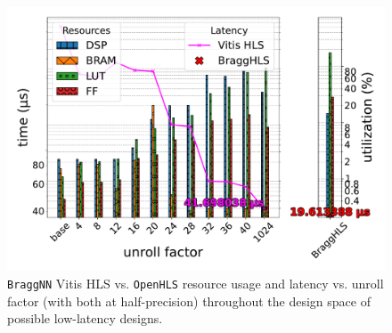 \documentclass[10pt]{sig-alternate}
\begin{document}
\begin{figure}[tbh]
\centering{}\includegraphics[width=1\columnwidth,trim=0 8mm 0 7mm,clip]{figures/braggnn}\caption{\texttt{BraggNN} Vitis HLS vs. \texttt{OpenHLS} resource usage and
latency vs. unroll factor (with both at half-precision) throughout the design space of possible low-latency designs.\texttt{\label{fig:braggnn}}}
\end{figure}
\end{document}
